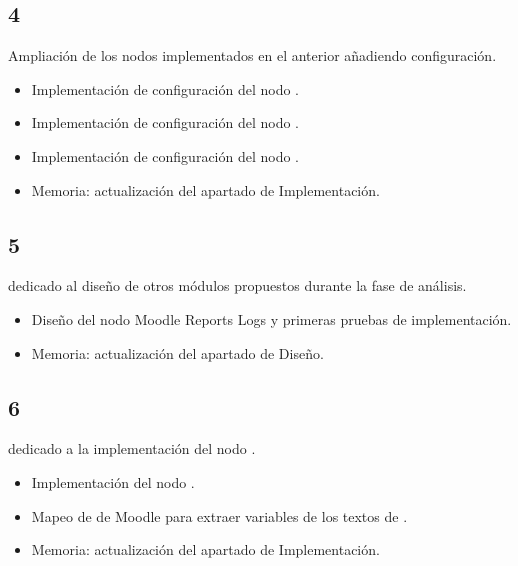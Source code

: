 \subsection{ 4}

Ampliación de los nodos implementados en el  anterior añadiendo configuración. 

\begin{itemize}
	\item Implementación de configuración del nodo .
	\item Implementación de configuración del nodo .
	\item Implementación de configuración del nodo .
	\item Memoria: actualización del apartado de Implementación. 
\end{itemize}


\subsection{ 5}

 dedicado al diseño de otros módulos propuestos durante la fase de análisis. 

\begin{itemize}
	\item Diseño del nodo Moodle Reports Logs y primeras pruebas de implementación. 
	\item Memoria: actualización del apartado de Diseño.
\end{itemize}



\subsection{ 6}

 dedicado a la implementación del nodo . 

\begin{itemize}
	\item Implementación del nodo . 
	\item Mapeo de  de Moodle para extraer variables de los textos de . 
	\item Memoria: actualización del apartado de Implementación. 
\end{itemize}



